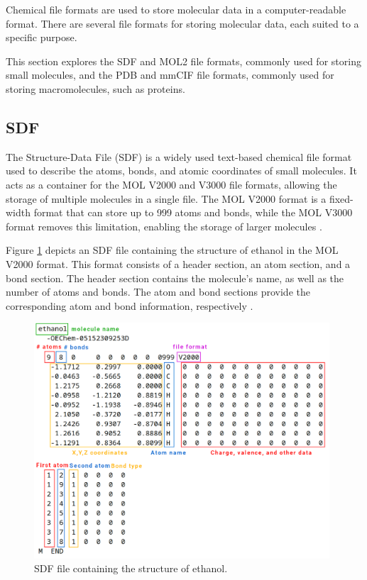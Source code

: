 \documentclass[
  digital,     %
  oneside,     %
  nosansbold,  %
  nocolorbold, %
  lof,         %
  lot,         %
]{fithesis4}
\begin{document}
Chemical file formats are used to store molecular data in a computer-readable format. There are several file formats for storing molecular data, each suited to a specific purpose.

This section explores the SDF and MOL2 file formats, commonly used for storing small molecules, and the PDB and mmCIF file formats, commonly used for storing macromolecules, such as proteins.

\subsection{SDF}
\label{subsection:sdf}

The Structure-Data File (SDF) is a widely used text-based chemical file format used to describe the atoms, bonds, and atomic coordinates of small molecules. It acts as a container for the MOL V2000 and V3000 file formats, allowing the storage of multiple molecules in a single file. The MOL V2000 format is a fixed-width format that can store up to 999 atoms and bonds, while the MOL V3000 format removes this limitation, enabling the storage of larger molecules \cite{mdl_ctfile,wikipedia_ctfile}.

Figure \ref{fig:sdf} depicts an SDF file containing the structure of ethanol in the MOL V2000 format. This format consists of a header section, an atom section, and a bond section. The header section contains the molecule's name, as well as the number of atoms and bonds. The atom and bond sections provide the corresponding atom and bond information, respectively \cite{belford2017anatomy}.

\begin{figure}[htbp]
  \begin{center}
    \includegraphics[width=11cm]{figures/sdf_file_format.png}
  \end{center}
  \caption{SDF file containing the structure of ethanol. \cite{belford2017anatomy}}
  \label{fig:sdf}
\end{figure}
\end{document}

